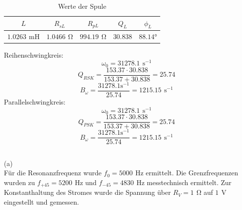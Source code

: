 \documentclass[a4paper, 12pt]{article}
\begin{document}
    \begin{table}[H]
    \begin{center}
    \begin{tabular}{@{}ccccc@{}}
    \toprule
    $L$   &    $R_{sL}$    &    $R_{pL}$    &      $Q_L$      &    $\phi_L$  \\ \midrule
    $1.0263 \,\ \si{\milli\henry}$ & $1.0466 \,\ \si{\ohm}$ & $994.19 \,\ \si{\ohm}$ & $30.838$ & $88.14 \si{\degree}$ \\ \bottomrule
    \end{tabular}
    \caption*{Werte der Spule}
    \end{center}
    \end{table}


    \begin{multicols*}{2}
      \begin{center}
      \small Reihenschwingkreis:
      $$\omega_0 = 31278.1 \,\ \si{\second}^{-1}$$
      $$Q_{RSK} = \frac{153.37 \cdot 30.838}{153.37+30.838} = 25.74$$
      $$B_{\omega} = \frac{31278.1 \si{\second}^{-1}}{25.74} = 1215.15 \,\ \si{\second}^{-1}$$
      \vfill\columnbreak
      \small Parallelschwingkreis:
      $$\omega_0 = 31278.1 \,\ \si{\second}^{-1} $$
      $$Q_{PSK} = \frac{153.37 \cdot 30.838}{153.37+30.838} = 25.74$$
      $$B_{\omega} = \frac{31278.1 \si{\second}^{-1}}{25.74} = 1215.15 \,\ \si{\second}^{-1}$$
      \end{center}
    \end{multicols*}

  \subsection{}
    \noindent (a)\\
      \indent Für die Resonanzfrequenz wurde $f_0 = 5000 \,\ \si{\hertz}$ ermittelt. Die Grenzfrequenzen wurden zu $f_{+45} = 5200 \,\ \si{\hertz} $ und $f_{-45} = 4830 \,\ \si{\hertz}$ messtechnisch ermittelt. Zur Konstanthaltung des Stromes wurde die Spannung über $R_V = 1 \,\ \si{\ohm}$ auf $1 \,\ \si{\volt}$ eingestellt und gemessen.
\end{document}
